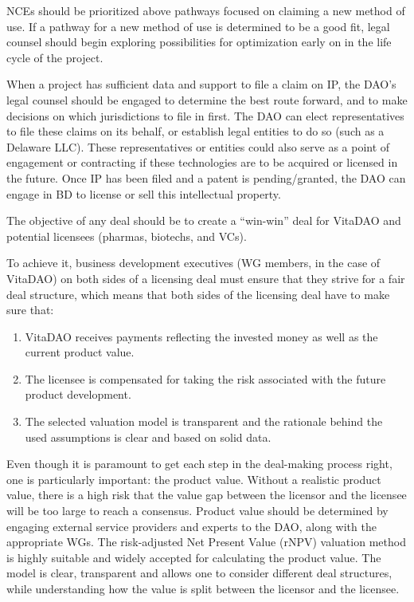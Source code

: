 \documentclass[12pt,letterpaper]{article}
\begin{document}
NCEs should be prioritized above pathways focused on claiming a new method of use. If a pathway for a new method of use is determined to be a good fit, legal counsel should begin exploring possibilities for optimization early on in the life cycle of the project. 

When a project has sufficient data and support to file a claim on IP, the DAO’s legal counsel should be engaged to determine the best route forward, and to make decisions on which jurisdictions to file in first. The DAO can elect representatives to file these claims on its behalf, or establish legal entities to do so (such as a Delaware LLC). These representatives or entities could also serve as a point of engagement or contracting if these technologies are to be acquired or licensed in the future. Once IP has been filed and a patent is pending/granted, the DAO can engage in BD to license or sell this intellectual property.

The objective of any deal should be to create a “win-win” deal for VitaDAO and potential licensees (pharmas, biotechs, and VCs).

To achieve it, business development executives (WG members, in the case of VitaDAO) on both sides of a licensing deal must ensure that they strive for a fair deal structure, which means that both sides of the licensing deal have to make sure that:

\begin{enumerate}
\item VitaDAO receives payments reflecting the invested money as well as the current product value.
\item The licensee is compensated for taking the risk associated with the future product development.
\item The selected valuation model is transparent and the rationale behind the used assumptions is clear and based on solid data.
\end{enumerate}

Even though it is paramount to get each step in the deal-making process right, one is particularly important: the product value. Without a realistic product value, there is a high risk that the value gap between the licensor and the licensee will be too large to reach a consensus. Product value should be determined by engaging external service providers and experts to the DAO, along with the appropriate WGs. The risk-adjusted Net Present Value (rNPV) valuation method is highly suitable and widely accepted for calculating the product value. The model is clear, transparent and allows one to consider different deal structures, while understanding how the value is split between the licensor and the licensee.
\end{document}
